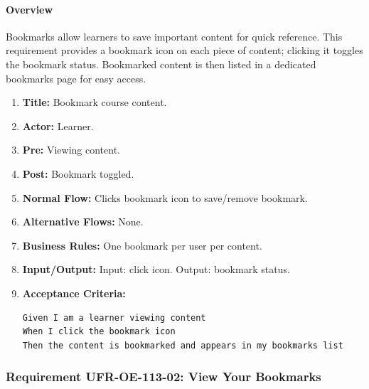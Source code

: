 \paragraph{Overview}
Bookmarks allow learners to save important content for quick reference. This requirement provides a bookmark icon on each piece of content; clicking it toggles the bookmark status. Bookmarked content is then listed in a dedicated bookmarks page for easy access.
\begin{enumerate}[label=\textbf{\arabic*.}]
\item \textbf{Title:} Bookmark course content.
\item \textbf{Actor:} Learner.
\item \textbf{Pre:} Viewing content.
\item \textbf{Post:} Bookmark toggled.
\item \textbf{Normal Flow:} Clicks bookmark icon to save/remove bookmark.
\item \textbf{Alternative Flows:} None.
\item \textbf{Business Rules:} One bookmark per user per content.
\item \textbf{Input/Output:} Input: click icon. Output: bookmark status.
\item \textbf{Acceptance Criteria:}
    \begin{verbatim}
Given I am a learner viewing content
When I click the bookmark icon
Then the content is bookmarked and appears in my bookmarks list
    \end{verbatim}
\end{enumerate}

\subsubsection{Requirement UFR-OE-113-02: View Your Bookmarks}
